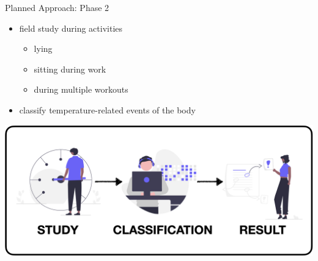 \documentclass[en]{sdqbeamer}
\begin{document}
\begin{frame}{Planned Approach: Phase 2}
    \begin{itemize}
        \item field study during activities
        \begin{itemize}
            \item lying
            \item sitting during work
            \item during multiple workouts
        \end{itemize}
        \item classify temperature-related events of the body
    \end{itemize}
    \begin{center}
        \includegraphics[scale=0.17]{proposal-presentation/images/analytics.png}    
    \end{center}
\end{frame}

\end{document}
